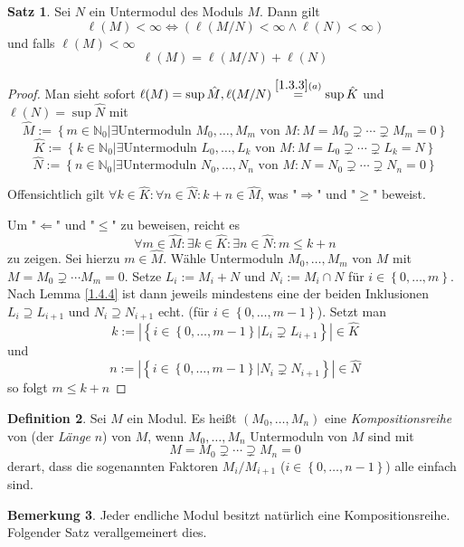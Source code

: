 \documentclass[
twoside=semi,
fontsize=12,
DIV=12, 
cleardoublepage=current,
leqno,
headings=optiontoheadandtoc, 
toc=idx
]{scrbook}
\newcommand{\N}{\mathbb{N}}
\newcommand{\brac}[1]{\left( #1 \right)}
\newcommand{\set}[1]{\left\{ #1 \right\}}
\theoremstyle{definition}
\newtheorem{definition}{Definition}[section]
\newtheorem{bemerkung}[definition]{Bemerkung}
\newtheorem{satz}[definition]{Satz}
\begin{document}
	\begin{satz}\label{1.4.10}
		Sei $N$ ein Untermodul des Moduls $M$. Dann gilt
			\[\ell(M) < \infty \Leftrightarrow \brac{\ell(M/N) < \infty \land \ell(N)< \infty}\]
		und falls $\ell(M) < \infty$
			\[\ell(M) = \ell(M/N) + \ell(N)\]
		
		\begin{proof}
			Man sieht sofort $\ell(M) = \sup \hat M, \ell(M/N) \overset{\ref{1.3.3}(a)}{=} \sup \hat{K}$ und $\ell(N) = \sup \hat N$ mit 
				\[\hat M := \set{m \in \N_0| \exists \textrm{Untermoduln } M_0, \dots, M_m \textrm{ von } M: M = M_0 \supsetneq \cdots \supsetneq M_m = 0}\]
				\[\hat K := \set{k \in \N_0| \exists \textrm{Untermoduln } L_0, \dots, L_k \textrm{ von } M: M = L_0 \supsetneq \cdots \supsetneq L_k = N}\]
				\[\hat N := \set{n \in \N_0| \exists \textrm{Untermoduln } N_0, \dots, N_n \textrm{ von } M: N = N_0 \supsetneq \cdots \supsetneq N_n = 0}\]
			
			Offensichtlich gilt $\forall k \in \hat K: \forall n \in \hat N: k + n \in \hat M$, was "$\Rightarrow$" und "$\geq$" beweist.
			
			\noindent Um "$\Leftarrow$" und "$\leq$" zu beweisen, reicht es 
				\[\forall m \in \hat M: \exists k \in \hat K: \exists n \in \hat N: m \leq k + n\]
			zu zeigen. Sei hierzu $m \in \hat M$. W\"ahle Untermoduln $M_0, \dots, M_m$ von $M$ mit $M=M_0 \supsetneq \cdots M_m = 0$.
			Setze $L_i := M_i + N$ und $N_i := M_i \cap N$ f\"ur $i \in \set{0, \dots, m}$. Nach Lemma \ref{1.4.4} ist dann jeweils mindestens eine der beiden Inklusionen $L_i \supseteq L_{i+1}$ und $N_i \supseteq N_{i+1}$ echt. (f\"ur $i \in \set{0, \dots, m-1}$). Setzt man
				\[k := |\set{i \in \set{0, \dots, m - 1}| L_i \supsetneq L_{i+1}}| \in \hat K\] und
				\[n := |\set{i \in \set{0, \dots, m - 1}| N_i \supsetneq N_{i+1}}| \in \hat N\]
			so folgt $m \leq k + n$ 
		\end{proof}
	\end{satz}

	\begin{definition}\label{1.4.11}
		Sei $M$ ein Modul. Es heißt $(M_0, \dots, M_n)$ eine \emph{Kompositionsreihe} von (der \emph{L\"ange} $n$) von $M$, wenn $M_0, \dots, M_n$ Untermoduln von $M$ sind mit 
			\[M=M_0 \supsetneq \cdots \supsetneq M_n = 0\]
		derart, dass die sogenannten Faktoren $M_i/M_{i+1}$ ($i \in \set{0, \dots, n-1}$) alle einfach sind.
	\end{definition}

	\begin{bemerkung}\label{1.4.12}
		Jeder endliche Modul besitzt nat\"urlich eine Kompositionsreihe. Folgender Satz verallgemeinert dies.
	\end{bemerkung}
\end{document}
